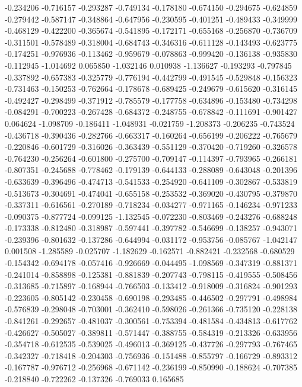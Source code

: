 -0.234206
-0.716157
-0.293287
-0.749134
-0.178180
-0.674150
-0.294675
-0.624859
-0.279442
-0.587147
-0.348864
-0.647956
-0.230595
-0.401251
-0.489433
-0.349999
-0.468129
-0.422200
-0.365674
-0.541895
-0.172171
-0.655168
-0.256870
-0.736709
-0.311501
-0.578489
-0.318004
-0.684743
-0.346316
-0.611128
-0.143493
-0.623775
-0.174251
-0.976936
-0.113462
-0.959679
-0.078863
-0.999420
-0.136138
-0.935830
-0.112945
-1.014692
0.065850
-1.032146
0.010938
-1.136627
-0.193293
-0.797845
-0.337892
-0.657383
-0.325779
-0.776194
-0.442799
-0.491545
-0.529848
-0.156323
-0.731463
-0.150253
-0.762664
-0.178678
-0.689425
-0.249679
-0.615620
-0.316145
-0.492427
-0.298499
-0.371912
-0.785579
-0.177758
-0.634896
-0.153480
-0.734298
-0.084291
-0.700223
-0.267428
-0.684372
-0.248755
-0.678842
-0.111691
-0.901427
0.064624
-1.098709
-0.186411
-1.048931
-0.021759
-1.208373
-0.206235
-0.743524
-0.436718
-0.390436
-0.282766
-0.663317
-0.160264
-0.656199
-0.206222
-0.765679
-0.220846
-0.601729
-0.316026
-0.363439
-0.551129
-0.370420
-0.719260
-0.326578
-0.764230
-0.256264
-0.601800
-0.275700
-0.709147
-0.114397
-0.793965
-0.266181
-0.807351
-0.245688
-0.778462
-0.179139
-0.644133
-0.288089
-0.643048
-0.201396
-0.633639
-0.396496
-0.474713
-0.541533
-0.254920
-0.641109
-0.302867
-0.533819
-0.513673
-0.304691
-0.474041
-0.655158
-0.253532
-0.369020
-0.430795
-0.379870
-0.337311
-0.616561
-0.270189
-0.718234
-0.034277
-0.971165
-0.146234
-0.971233
-0.090375
-0.877724
-0.099125
-1.132545
-0.072230
-0.803469
-0.243276
-0.688248
-0.173338
-0.812480
-0.318987
-0.597441
-0.397782
-0.546699
-0.138257
-0.943071
-0.239396
-0.801632
-0.137286
-0.644994
-0.031172
-0.953756
-0.085767
-1.042147
0.001508
-1.285589
-0.025707
-1.182629
-0.162571
-0.882421
-0.232568
-0.680529
-0.154342
-0.694178
-0.057416
-0.926669
-0.044495
-1.098569
-0.347319
-0.881371
-0.241014
-0.858898
-0.125381
-0.881839
-0.207743
-0.798115
-0.419555
-0.508456
-0.313685
-0.715897
-0.168944
-0.766503
-0.133412
-0.918009
-0.316824
-0.901293
-0.223605
-0.805142
-0.230458
-0.690198
-0.293485
-0.446502
-0.297791
-0.498984
-0.576839
-0.298048
-0.703001
-0.362410
-0.598026
-0.261366
-0.735120
-0.228138
-0.841261
-0.292657
-0.481037
-0.300561
-0.753394
-0.481584
-0.434813
-0.617762
-0.426627
-0.505027
-0.389811
-0.571447
-0.388755
-0.584319
-0.213326
-0.633956
-0.354718
-0.612535
-0.539025
-0.496013
-0.369125
-0.437726
-0.297793
-0.767465
-0.342327
-0.718418
-0.204303
-0.756936
-0.151488
-0.855797
-0.166729
-0.893312
-0.167787
-0.976712
-0.256968
-0.671142
-0.236199
-0.850990
-0.188624
-0.707385
-0.218840
-0.722262
-0.137326
-0.769033
0.165685
